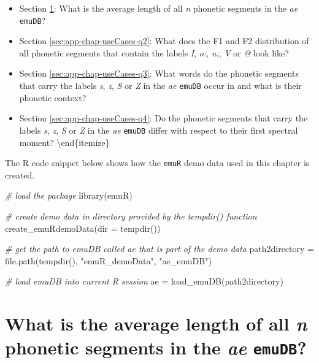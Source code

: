 \documentclass[
]{book}
\newenvironment{Shaded}{\begin{snugshade}}{\end{snugshade}}
\newcommand{\AttributeTok}[1]{\textcolor[rgb]{0.77,0.63,0.00}{#1}}
\newcommand{\CommentTok}[1]{\textcolor[rgb]{0.56,0.35,0.01}{\textit{#1}}}
\newcommand{\FunctionTok}[1]{\textcolor[rgb]{0.00,0.00,0.00}{#1}}
\newcommand{\NormalTok}[1]{#1}
\newcommand{\OtherTok}[1]{\textcolor[rgb]{0.56,0.35,0.01}{#1}}
\newcommand{\StringTok}[1]{\textcolor[rgb]{0.31,0.60,0.02}{#1}}
\providecommand{\tightlist}{%
  \setlength{\itemsep}{0pt}\setlength{\parskip}{0pt}}
\begin{document}
\begin{itemize}
\tightlist
\item
  Section \ref{sec:app-chap-useCases-q1}: What is the average length of all \emph{n} phonetic segments in the \emph{ae} \texttt{emuDB}?
\item
  Section \ref{sec:app-chap-useCases-q2}: What does the F1 and F2 distribution of all phonetic segments that contain the labels \emph{I}, \emph{o:}, \emph{u:}, \emph{V} or \emph{@} look like?
\item
  Section \ref{sec:app-chap-useCases-q3}: What words do the phonetic segments that carry the labels \emph{s}, \emph{z}, \emph{S} or \emph{Z} in the \emph{ae} \texttt{emuDB} occur in and what is their phonetic context?
\item
  Section \ref{sec:app-chap-useCases-q4}: Do the phonetic segments that carry the labels \emph{s}, \emph{z}, \emph{S} or \emph{Z} in the \emph{ae} \texttt{emuDB} differ with respect to their first spectral moment?
  \textbackslash end\{itemize\}
\end{itemize}

The R code snippet below shows how the \texttt{emuR} demo data used in this chapter is created.

\begin{Shaded}
\begin{Highlighting}[]
\CommentTok{\# load the package }
\FunctionTok{library}\NormalTok{(emuR)}

\CommentTok{\# create demo data in directory provided by the tempdir() function}
\FunctionTok{create\_emuRdemoData}\NormalTok{(}\AttributeTok{dir =} \FunctionTok{tempdir}\NormalTok{())}

\CommentTok{\# get the path to emuDB called \textquotesingle{}ae\textquotesingle{} that is part of the demo data}
\NormalTok{path2directory }\OtherTok{=} \FunctionTok{file.path}\NormalTok{(}\FunctionTok{tempdir}\NormalTok{(), }\StringTok{"emuR\_demoData"}\NormalTok{, }\StringTok{"ae\_emuDB"}\NormalTok{)}

\CommentTok{\# load emuDB into current R session}
\NormalTok{ae }\OtherTok{=} \FunctionTok{load\_emuDB}\NormalTok{(path2directory)}
\end{Highlighting}
\end{Shaded}

\hypertarget{sec:app-chap-useCases-q1}{%
\section{\texorpdfstring{What is the average length of all \emph{n} phonetic segments in the \emph{ae} \texttt{emuDB}?}{What is the average length of all n phonetic segments in the ae emuDB?}}\label{sec:app-chap-useCases-q1}}
\end{document}
